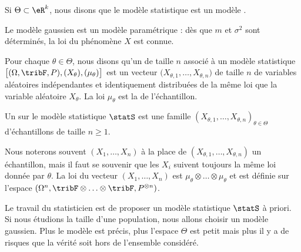 \begin{definition}
	Si \( \Theta\subset\eR^k\), nous disons que le modèle statistique est un modèle .
\end{definition}
Le modèle gaussien est un modèle paramétrique : dès que \( m\) et \( \sigma^2\) sont déterminés, la loi du phénomène \( X\) est connue.

\begin{definition}
	Pour chaque \( \theta\in\Theta\), nous disons qu'un  de taille \( n\) associé à un modèle statistique \( \big[ (\Omega,\tribF,P),(X_{\theta}),(\mu_{\theta}) \big]\) est un vecteur \( \big( X_{\theta,1},\ldots,X_{\theta,n} \big)\) de taille \( n\) de variables aléatoires indépendantes et identiquement distribuées de la même loi que la variable aléatoire \( X_{\theta}\). La loi \( \mu_{\theta}\) est la  de l'échantillon.
\end{definition}

\begin{definition}
	Un  sur le modèle statistique \( \statS\) est une famille \( (X_{\theta,1},\ldots, X_{\theta,n})_{\theta\in\Theta}\) d'échantillons de taille \( n\geq 1\).
\end{definition}

Nous noterons souvent \( (X_1,\ldots,X_n)\) à la place de \( (X_{\theta,1},\ldots,X_{\theta,n})\) un échantillon, mais il faut se souvenir que les \( X_i\) suivent toujours la même loi donnée par \( \theta\). La loi du vecteur \( (X_1,\ldots,X_n)\) est \( \mu_{\theta}\otimes\ldots\otimes\mu_{\theta}\) et est définie sur l'espace \( (\Omega^n,\tribF\otimes\ldots\otimes\tribF,P^{\otimes n})\).

\begin{remark}
	Le travail du statisticien est de proposer un modèle statistique \( \statS\) à priori. Si nous étudions la taille d'une population, nous allons choisir un modèle gaussien. Plus le modèle est précis, plus l'espace \( \Theta\) est petit mais plus il y a de risques que la vérité soit hors de l'ensemble considéré.
\end{remark}

